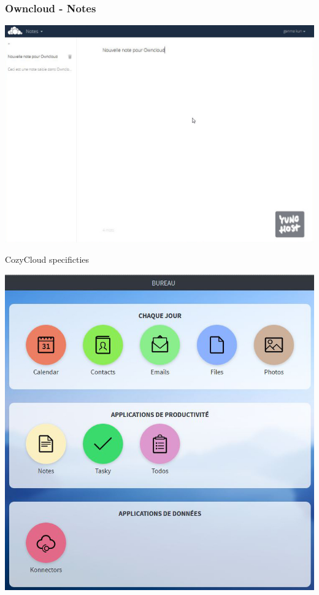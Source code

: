 \documentclass{beamer}
\begin{document}
\begin{frame}
\frametitle{Owncloud - Notes}
\includegraphics[scale=0.3] {./Owncloud/Owncloud_Notes.jpg}
\end{frame}
\begin{frame}
\Huge{\centerline{CozyCloud specificties}}
\begin{center}
\includegraphics[scale=0.25] {./CozyCloud/CozyCloud_Bureau.jpg}
\end{center}
\end{frame}
\end{document}
